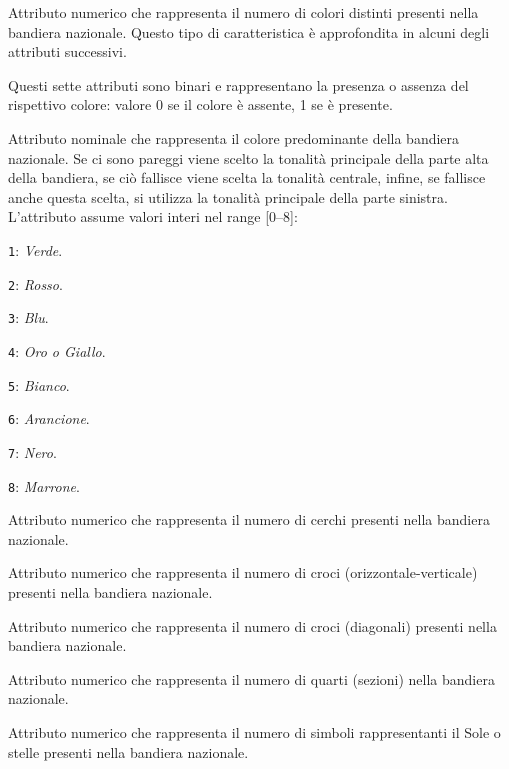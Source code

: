 \documentclass[a4paper,11pt,twoside,notitlepage,final]{scrartcl}
\begin{document}
\begin{description}
  \item[Colori]
    Attributo numerico che rappresenta il numero di colori distinti presenti nella bandiera nazionale.
    Questo tipo di caratteristica è approfondita in alcuni degli attributi successivi.

  \item[Rosso; Verde; Blu; Oro (e Giallo); Bianco; Nero; Arancione]
    Questi sette attributi sono binari e rappresentano la presenza o assenza del rispettivo colore: valore 0 se il colore è assente, 1 se è presente.

  \item[Tonalità principale]
    Attributo nominale che rappresenta il colore predominante della bandiera nazionale.
    Se ci sono pareggi viene scelto la tonalità principale della parte alta della bandiera, se ciò fallisce viene scelta la tonalità centrale, infine, se fallisce anche questa scelta, si utilizza la tonalità principale della parte sinistra.
    L'attributo assume valori interi nel range [0--8]:
    \item \texttt{1}: \emph{Verde}.
    \item \texttt{2}: \emph{Rosso}.
    \item \texttt{3}: \emph{Blu}.
    \item \texttt{4}: \emph{Oro o Giallo}.
    \item \texttt{5}: \emph{Bianco}.
    \item \texttt{6}: \emph{Arancione}.
    \item \texttt{7}: \emph{Nero}.
    \item \texttt{8}: \emph{Marrone}.

  \item[Cerchi]
    Attributo numerico che rappresenta il numero di cerchi presenti nella bandiera nazionale.

  \item[Croci]
  Attributo numerico che rappresenta il numero di croci (orizzontale-verticale) presenti nella bandiera nazionale.

  \item[Saltires]
    Attributo numerico che rappresenta il numero di croci (diagonali) presenti nella bandiera nazionale.

  \item[Quarti]
    Attributo numerico che rappresenta il numero di quarti (sezioni) nella bandiera nazionale.

  \item[Sunstars]
    Attributo numerico che rappresenta il numero di simboli rappresentanti il Sole o stelle presenti nella bandiera nazionale.


\end{description}
\end{document}
